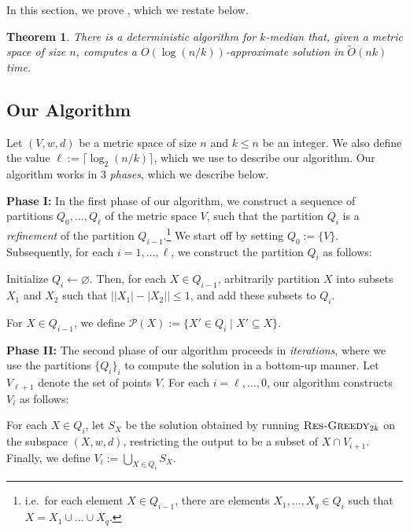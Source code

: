 \documentclass[11pt]{article}
\newenvironment{wrapper}[1]
{
\begin{center}
		\begin{minipage}{\linewidth}
			\begin{mdframed}[hidealllines=true, backgroundcolor=gray!20, leftmargin=0cm,innerleftmargin=0.4cm,innerrightmargin=0.4cm,innertopmargin=0.4cm,innerbottommargin=0.4cm,roundcorner=0pt]
				#1}
			{\end{mdframed}
		\end{minipage}
	\end{center}
}
\newcommand{\1}{\mathmybb{1}}
\newtheorem{theorem}{Theorem}[section]
\newcommand{\Restr}{\textnormal{\textsc{Res-Greedy}}}
\begin{document}
In this section, we prove , which we restate below.

\begin{theorem}\label{thm:main:fast:restate}
    There is a deterministic algorithm for $k$-median that, given a metric space of size $n$, computes a $O(\log(n/k))$-approximate solution in $\tilde O(nk)$ time.
\end{theorem}

\subsection{Our Algorithm}

Let $(V, w, d)$ be a metric space of size $n$ and $k \leq n$ be an integer.
We also define the value $\ell := \lceil \log_2(n/k) \rceil$, which we use to describe our algorithm.
Our algorithm works in 3 \emph{phases}, which we describe below.

\medskip
\noindent
\textbf{Phase I:} In the first phase of our algorithm, we construct a sequence of partitions $Q_0,\dots, Q_\ell$ of the metric space $V$, such that the partition $Q_i$ is a \emph{refinement} of the partition $Q_{i-1}$.\footnote{i.e.~for each element $X \in Q_{i-1}$, there are elements $X_1,\dots, X_q \in Q_i$ such that $X=X_1\cup \dots \cup X_q$.} We start off by setting $Q_0 := \{V\}$. Subsequently, for each $i = 1,\dots,\ell$, we construct the partition $Q_i$ as follows:

\begin{wrapper}
    Initialize $Q_i \leftarrow \varnothing$. Then, for each $X \in Q_{i-1}$, arbitrarily partition $X$ into subsets $X_1$ and $X_{2}$ such that $\left||X_1| - |X_2|\right| \leq 1$, and add these subsets to $Q_i$.
\end{wrapper}
For $X \in Q_{i-1}$, we define $\mathcal P(X) := \{X' \in Q_{i} \mid X' \subseteq X\}$.

\medskip
\noindent
\textbf{Phase II:}
The second phase of our algorithm proceeds in \emph{iterations}, where we use the partitions $\{Q_i\}_i$ to compute the solution in a bottom-up manner.
Let $V_{\ell + 1}$ denote the set of points $V$.
For each $i = \ell ,\dots, 0$, our algorithm constructs $V_i$ as follows:

\begin{wrapper}
    For each $X \in Q_i$, let $S_X$ be the solution obtained by running $\Restr_{2k}$ on the subspace $(X,w,d)$, restricting the output to be a subset of $X \cap V_{i+1}$. Finally, we define $V_i := \bigcup_{X \in Q_i} S_X$.
\end{wrapper}
\end{document}
